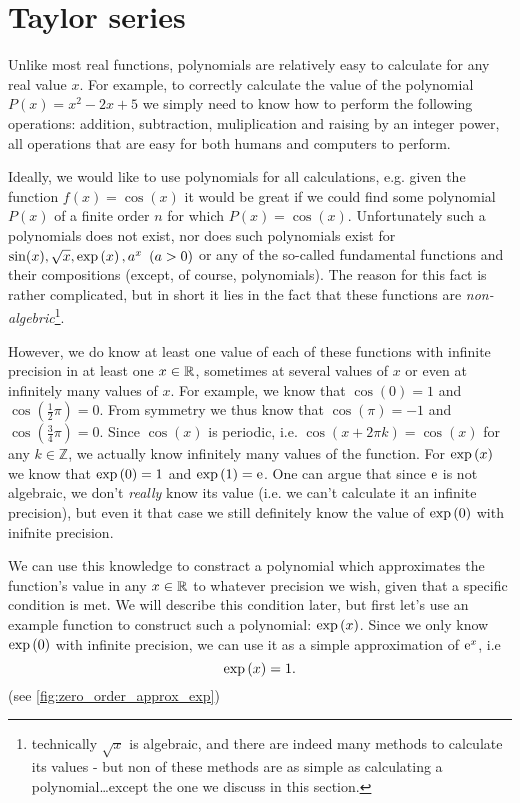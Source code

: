 \section{Taylor series}
Unlike most real functions, polynomials are relatively easy to calculate for any real value $x$. For example, to correctly calculate the value of the polynomial $P(x)=x^{2}-2x+5$ we simply need to know how to perform the following operations: addition, subtraction, muliplication and raising by an integer power, all operations that are easy for both humans and computers to perform.

Ideally, we would like to use polynomials for all calculations, e.g. given the function $f(x) = \cos(x)$ it would be great if we could find some polynomial $P(x)$ of a finite order $n$ for which $P(x)=\cos(x)$. Unfortunately such a polynomials does not exist, nor does such polynomials exist for $\sin(x), \sqrt{x}, \exp\left(x\right), a^{x}\ \left(a>0\right)$ or any of the so-called fundamental functions and their compositions (except, of course, polynomials). The reason for this fact is rather complicated, but in short it lies in the fact that these functions are \textit{non-algebric}\footnote{technically $\sqrt{x}$ is algebraic, and there are indeed many methods to calculate its values - but non of these methods are as simple as calculating a polynomial\dots except the one we discuss in this section.}.

However, we do know at least one value of each of these functions with infinite precision in at least one $x\in\mathbb{R}^{}$, sometimes at several values of $x$ or even at infinitely many values of $x$. For example, we know that $\cos(0)=1$ and $\cos\left(\frac{1}{2}\pi\right)=0$. From symmetry we thus know that $\cos(\pi)=-1$ and $\cos\left(\frac{3}{4}\pi\right)=0$. Since $\cos(x)$ is periodic, i.e. $\cos\left(x+2\pi k\right)=\cos(x)$ for any $k\in\mathbb{Z}$, we actually know infinitely many values of the function. For $\exp\left(x\right)$ we know that $\exp\left(0\right)=1$ and $\exp\left(1\right)=\mathrm{e}$. One can argue that since $\mathrm{e}$ is not algebraic, we don't \textit{really} know its value (i.e. we can't calculate it an infinite precision), but even it that case we still definitely know the value of $\exp\left(0\right)$ with inifnite precision.

We can use this knowledge to constract a polynomial which approximates the function's value in any $x\in\mathbb{R}^{}$ to whatever precision we wish, given that a specific condition is met. We will describe this condition later, but first let's use an example function to construct such a polynomial: $\exp\left(x\right)$. Since we only know $\exp\left(0\right)$ with infinite precision, we can use it as a simple approximation of $\mathrm{e}^{x}$, i.e
\begin{equation}
  \exp\left(x\right) = 1.
  \label{eq:zero_order_approx_exp}
\end{equation}
(see \autoref{fig:zero_order_approx_exp})

